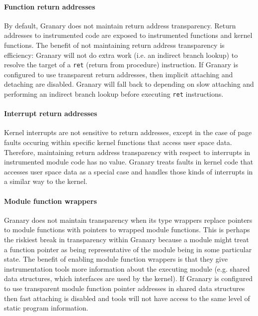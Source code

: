 \documentclass{sigplanconf}
\begin{document}
\paragraph{Function return addresses}\label{para:return_address_transparency} By default, Granary does not maintain return address transparency. Return addresses to instrumented code are exposed to instrumented functions and kernel functions. The benefit of not maintaining return address transparency is efficiency: Granary will not do extra work (i.e. an indirect branch lookup) to resolve the target of a \texttt{ret} (return from procedure) instruction. If Granary is configured to use transparent return addresses, then implicit attaching and detaching are disabled. Granary will fall back to depending on slow attaching and performing an indirect branch lookup before executing \texttt{ret} instructions.

\paragraph{Interrupt return addresses} Kernel interrupts are not sensitive to return addresses, except in the case of page faults occuring within specific kernel functions that access user space data. Therefore, maintaining return address transparency with respect to interrupts in instrumented module code has no value. Granary treats faults in kernel code that accesses user space data as a special case and handles those kinds of interrupts in a similar way to the kernel.


\paragraph{Module function wrappers} Granary does not maintain transparency when its type wrappers replace pointers to module functions with pointers to wrapped module functions. This is perhaps the riskiest break in transparency within Granary because a module might treat a function pointer as being representative of the module being in some particular state. The benefit of enabling module function wrappers is that they give instrumentation tools more information about the executing module (e.g. shared data structures, which interfaces are used by the kernel). If Granary is configured to use transparent module function pointer addresses in shared data structures then fast attaching is disabled and tools will not have access to the same level of static program information.
\end{document}
